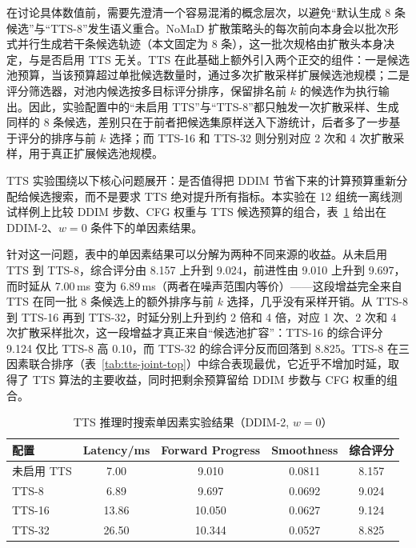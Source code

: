 在讨论具体数值前，需要先澄清一个容易混淆的概念层次，以避免``默认生成 8 条候选''与``TTS-8''发生语义重合。NoMaD 扩散策略头的每次前向本身会以批次形式并行生成若干条候选轨迹（本文固定为 8 条），这一批次规格由扩散头本身决定，与是否启用 TTS 无关。TTS 在此基础上额外引入两个正交的组件：一是候选池预算，当该预算超过单批候选数量时，通过多次扩散采样扩展候选池规模；二是评分筛选器，对池内候选按多目标评分排序，保留排名前 $k$ 的候选作为执行输出。因此，实验配置中的``未启用 TTS''与``TTS-8''都只触发一次扩散采样、生成同样的 8 条候选，差别只在于前者把候选集原样送入下游统计，后者多了一步基于评分的排序与前 $k$ 选择；而 TTS-16 和 TTS-32 则分别对应 2 次和 4 次扩散采样，用于真正扩展候选池规模。

TTS 实验围绕以下核心问题展开：是否值得把 DDIM 节省下来的计算预算重新分配给候选搜索，而不是要求 TTS 绝对提升所有指标。本实验在 12 组统一离线测试样例上比较 DDIM 步数、CFG 权重与 TTS 候选预算的组合，表~\ref{tab:tts-results} 给出在 DDIM-2、$w=0$ 条件下的单因素结果。

针对这一问题，表中的单因素结果可以分解为两种不同来源的收益。从未启用 TTS 到 TTS-8，综合评分由 8.157 上升到 9.024，前进性由 9.010 上升到 9.697，而时延从 7.00\,ms 变为 6.89\,ms（两者在噪声范围内等价）——这段增益完全来自 TTS 在同一批 8 条候选上的额外排序与前 $k$ 选择，几乎没有采样开销。从 TTS-8 到 TTS-16 再到 TTS-32，时延分别上升到约 2 倍和 4 倍，对应 1 次、2 次和 4 次扩散采样批次，这一段增益才真正来自``候选池扩容''：TTS-16 的综合评分 9.124 仅比 TTS-8 高 0.10，而 TTS-32 的综合评分反而回落到 8.825。TTS-8 在三因素联合排序（表~\ref{tab:tts-joint-top}）中综合表现最优，它近乎不增加时延，取得了 TTS 算法的主要收益，同时把剩余预算留给 DDIM 步数与 CFG 权重的组合。

\begin{table}[htbp]
    \centering
    \caption{TTS 推理时搜索单因素实验结果（DDIM-2, $w=0$）}
    \label{tab:tts-results}
    \begin{tabular}{lcccc}
        \toprule
        配置 & Latency/ms & Forward Progress & Smoothness & 综合评分 \\
        \midrule
        未启用 TTS & 7.00 & 9.010 & 0.0811 & 8.157 \\
        TTS-8 & 6.89 & 9.697 & 0.0692 & 9.024 \\
        TTS-16 & 13.86 & 10.050 & 0.0627 & 9.124 \\
        TTS-32 & 26.50 & 10.344 & 0.0527 & 8.825 \\
        \bottomrule
    \end{tabular}
\end{table}

